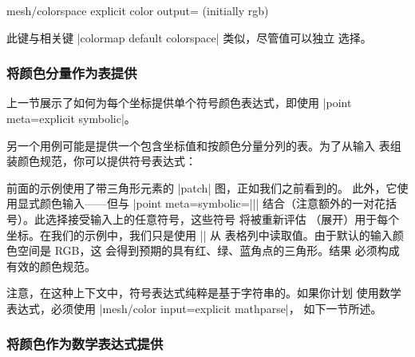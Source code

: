 {{\begin{pgfplotskey}{%
    mesh/colorspace explicit color output= (initially rgb)%
}
\begin{codeexample}[]
\end{codeexample}

    此键与相关键 |colormap default colorspace| 类似，尽管值可以独立
    选择。
\end{pgfplotskey}


\subsubsection{将颜色分量作为表提供}

上一节展示了如何为每个坐标提供单个符号颜色表达式，即使用
|point meta=explicit symbolic|。

另一个用例可能是提供一个包含坐标值和按颜色分量分列的表。为了从输入
表组装颜色规范，你可以提供符号表达式：
%
\begin{codeexample}[]
\end{codeexample}
%
前面的示例使用了带三角形元素的 |patch| 图，正如我们之前看到的。
此外，它使用显式颜色输入——但与 |point meta={symbolic=||}|
结合（注意额外的一对花括号）。此选择接受输入上的任意符号，这些符号
将被重新评估
（展开）用于每个坐标。在我们的示例中，我们只是使用 |\thisrow| 从
表格列中读取值。由于默认的输入颜色空间是 RGB，这
会得到预期的具有红、绿、蓝角点的三角形。结果
必须构成有效的颜色规范。

注意，在这种上下文中，符号表达式纯粹是基于字符串的。如果你计划
使用数学表达式，必须使用 |mesh/color input=explicit mathparse|，
如下一节所述。


\subsubsection{将颜色作为数学表达式提供}
\label{sec:surf:explicit:color:math}

}}
